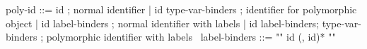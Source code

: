 \begin{syntax}
  poly-id ::= id ; normal identifier
  | id type-var-binders ; identifier for polymorphic object
  | id label-binders ; normal identifier with labels
  | id label-binders;
       type-var-binders ; polymorphic identifier with labels
  \
  label-binders ::= "{" id (, id)* "}"
\end{syntax}